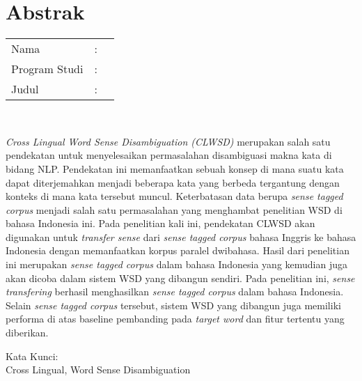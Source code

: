 %
%
%

\chapter*{Abstrak}

\vspace*{0.2cm}

\noindent \begin{tabular}{l l p{10cm}}
	Nama&: & \penulis \\
	Program Studi&: & \program \\
	Judul&: & \judul \\
\end{tabular} \\ 

\vspace*{0.5cm}

\noindent
\textit{Cross Lingual Word Sense Disambiguation (CLWSD)} merupakan salah satu pendekatan untuk menyelesaikan permasalahan disambiguasi makna kata di bidang NLP. Pendekatan ini memanfaatkan sebuah konsep di mana suatu kata dapat diterjemahkan menjadi beberapa kata yang berbeda tergantung dengan konteks di mana kata tersebut muncul. Keterbatasan data berupa \textit{sense tagged corpus} menjadi salah satu permasalahan yang menghambat penelitian WSD di bahasa Indonesia ini. Pada penelitian kali ini, pendekatan CLWSD akan digunakan untuk \textit{transfer sense} dari \textit{sense tagged corpus} bahasa Inggris ke bahasa Indonesia dengan memanfaatkan korpus paralel dwibahasa. Hasil dari penelitian ini merupakan \textit{sense tagged corpus} dalam bahasa Indonesia yang kemudian juga akan dicoba dalam sistem WSD yang dibangun sendiri. Pada penelitian ini, \textit{sense transfering} berhasil menghasilkan \textit{sense tagged corpus} dalam bahasa Indonesia. Selain \textit{sense tagged corpus} tersebut, sistem WSD yang dibangun juga memiliki performa di atas baseline pembanding pada \textit{target word} dan fitur tertentu yang diberikan.


\vspace*{0.2cm}

\noindent Kata Kunci: \\ 
\noindent Cross Lingual, Word Sense Disambiguation

\newpage